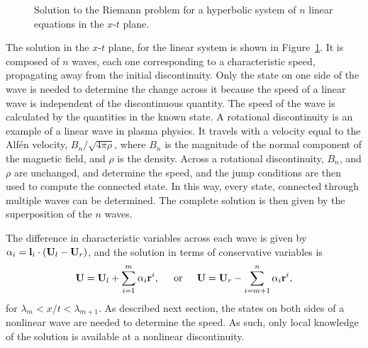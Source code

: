 \begin{figure}[htbp]\figSpace
\begin{center}

\end{center}
\caption{Solution to the Riemann problem for a hyperbolic system of $n$ linear equations in the $x$-$t$ plane.}
\label{fig:lin_sys_rstates}
\figSpace
\end{figure}

The solution in the $x$-$t$ plane, for the linear system is shown in Figure~\ref{fig:lin_sys_rstates}.  It is composed of $n$ waves, each one corresponding to a characteristic speed, propagating away from the initial discontinuity.  Only the state on one side of the wave is needed to determine the change across it because the speed of a linear wave is independent of the discontinuous quantity.  The speed of the wave is calculated by the quantities in the known state.  A rotational discontinuity is an example of a linear wave in plasma physics.  It travels with a velocity equal to the Alf{\'e}n velocity, $B_n/\sqrt{4\pi\rho}$, where $B_n$ is the magnitude of the normal component of the magnetic field, and $\rho$ is the density.  Across a rotational discontinuity, $B_n$, and $\rho$ are unchanged, and determine the speed, and the jump conditions are then used to compute the connected state.  In this way, every state, connected through multiple waves can be determined.  The complete solution is then given by the superposition of the $n$ waves.  

The difference in characteristic variables across each wave is given by $\alpha_i = \mathbf{l}_i \cdot (\mathbf{U}_l - \mathbf{U}_r)$, and the solution in terms of conservative variables is 
\begin{gather*} 
\mathbf{U} = \mathbf{U}_l + \sum_{i=1}^m \alpha_i \mathbf{r}^i, \;\;\;\;\text{ or }\;\;\;\; \mathbf{U} = \mathbf{U}_r - \sum_{i=m+1}^n \alpha_i \mathbf{r}^i,
\end{gather*} 
for $\lambda_m < x/t < \lambda_{m+1}$.  As described next section, the states on both sides of a nonlinear wave are needed to determine the speed.  As such, only local knowledge of the solution is available at a nonlinear discontinuity.

